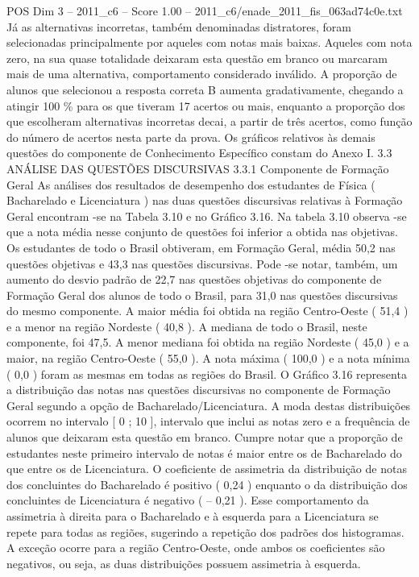 \begin{textsample}{POS Dim 3 – 2011\_c6 – Score 1.00 – 2011\_c6/enade\_2011\_fis\_063ad74c0e.txt}
Já as alternativas incorretas, também denominadas distratores, foram selecionadas principalmente por aqueles com notas mais baixas.
Aqueles com nota zero, na sua quase totalidade deixaram esta questão em branco ou marcaram mais de uma alternativa, comportamento considerado inválido.
A proporção de alunos que selecionou a resposta correta B aumenta gradativamente, chegando a atingir 100 \% para os que tiveram 17 acertos ou mais, enquanto a proporção dos que escolheram alternativas incorretas decai, a partir de três acertos, como função do número de acertos nesta parte da prova.
Os gráficos relativos às demais questões do componente de Conhecimento Específico constam do Anexo I. 3.3 ANÁLISE DAS QUESTÕES DISCURSIVAS 3.3.1 Componente de Formação Geral As análises dos resultados de desempenho dos estudantes de Física ( Bacharelado e Licenciatura ) nas duas questões discursivas relativas à Formação Geral encontram -se na Tabela 3.10 e no Gráfico 3.16.
Na tabela 3.10 observa -se que a nota média nesse conjunto de questões foi inferior a obtida nas objetivas.
Os estudantes de todo o Brasil obtiveram, em Formação Geral, média 50,2 nas questões objetivas e 43,3 nas questões discursivas.
Pode -se notar, também, um aumento do desvio padrão de 22,7 nas questões objetivas do componente de Formação Geral dos alunos de todo o Brasil, para 31,0 nas questões discursivas do mesmo componente.
A maior média foi obtida na região Centro-Oeste ( 51,4 ) e a menor na região Nordeste ( 40,8 ).
A mediana de todo o Brasil, neste componente, foi 47,5.
A menor mediana foi obtida na região Nordeste ( 45,0 ) e a maior, na região Centro-Oeste ( 55,0 ).
A nota máxima ( 100,0 ) e a nota mínima ( 0,0 ) foram as mesmas em todas as regiões do Brasil.
O Gráfico 3.16 representa a distribuição das notas nas questões discursivas no componente de Formação Geral segundo a opção de Bacharelado/Licenciatura.
A moda destas distribuições ocorrem no intervalo [ 0 ; 10 ], intervalo que inclui as notas zero e a frequência de alunos que deixaram esta questão em branco.
Cumpre notar que a proporção de estudantes neste primeiro intervalo de notas é maior entre os de Bacharelado do que entre os de Licenciatura.
O coeficiente de assimetria da distribuição de notas dos concluintes do Bacharelado é positivo ( 0,24 ) enquanto o da distribuição dos concluintes de Licenciatura é negativo ( – 0,21 ).
Esse comportamento da assimetria à direita para o Bacharelado e à esquerda para a Licenciatura se repete para todas as regiões, sugerindo a repetição dos padrões dos histogramas.
A exceção ocorre para a região Centro-Oeste, onde ambos os coeficientes são negativos, ou seja, as duas distribuições possuem assimetria à esquerda.

\end{textsample}
